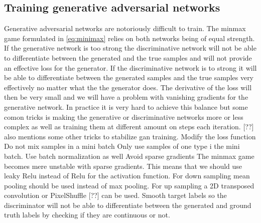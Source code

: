 \documentclass{kththesis}
\begin{document}
\subsection{Training generative adversarial networks}
Generative adversarial networks are notoriously difficult to train. The minmax game formulated in \ref{eq:minimax} relies on both networks being of equal strength. If the generative network is too strong the discriminative network will not be able to differentiate between the generated and the true samples and will not provide an effective loss for the generator. If the discriminative network is to strong it will be able to differentiate between the generated samples and the true samples very effectively no matter what the the generator does. The derivative of the loss will then be very small and we will have a problem with vanishing gradients for the generative network. In practice it is very hard to achieve this balance but some comon tricks is making the generative or discriminative networks more or less complex as well as training them at different amount on steps each iteration. [??] also mentions some other tricks to stabilize gan training.
Modify the loss function
Do not mix samples in a mini batch
Only use samples of one type i the mini batch. Use batch normalization as well
Avoid sparse gradients
The minmax game becomes mere unstable with sparse gradients. This means that we should use leaky Relu instead of Relu for the activation function. For down sampling mean pooling should be used instead of max pooling. For up sampling a 2D transposed convolution or PixelShuffle [??] can be used.
Smooth target labels so the discriminator will not be able to differentiate between the generated and ground truth labels by checking if they are continuous or not.
\end{document}
